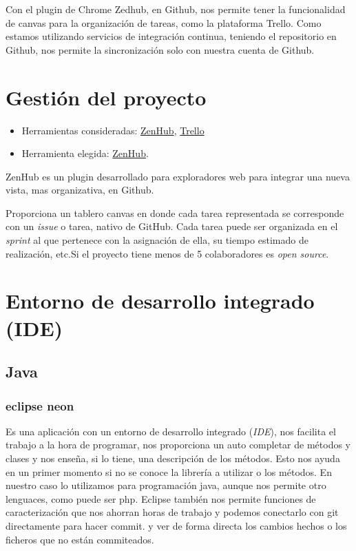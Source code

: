 Con el plugin de Chrome Zedhub, en Github, nos permite tener la funcionalidad de canvas para la organización de tareas, como la plataforma Trello. Como estamos utilizando servicios de integración continua, teniendo el repositorio en Github, nos permite la sincronización solo con nuestra cuenta de Github. \cite{web:github}

\section{Gestión del proyecto}\label{gestion-del-proyecto}

\begin{itemize}
	\tightlist
	\item
	Herramientas consideradas: \href{https://www.zenhub.com/}{ZenHub},
	\href{https://trello.com/}{Trello}
	\item
	Herramienta elegida: \href{https://www.zenhub.com/}{ZenHub}.
\end{itemize}

ZenHub es un plugin desarrollado para exploradores web para integrar una nueva vista, mas organizativa, en Github. 

Proporciona un tablero canvas en donde cada tarea representada se corresponde con un \emph{issue} o tarea, nativo de GitHub. Cada tarea puede ser organizada en el \emph{sprint} al que pertenece con la asignación de ella, su tiempo estimado de realización, etc.Si el proyecto tiene menos de 5 colaboradores es \emph{open source}. \cite{web:zenhub}


\section{Entorno de desarrollo integrado
	(IDE)}\label{entorno-de-desarrollo-integrado-ide}

\subsection{Java}\label{java}

\subsubsection{eclipse neon}\label{eclipse}
Es una aplicación con un entorno de desarrollo integrado (\emph{IDE}), nos facilita el trabajo a la hora de programar, nos proporciona un auto completar de métodos y clases y nos enseña, si lo tiene, una descripción de los métodos. Esto nos ayuda en un primer momento si no se conoce la librería a utilizar o los métodos. En nuestro caso lo utilizamos para programación java, aunque nos permite otro lenguaces, como puede ser php.
Eclipse también nos permite funciones de caracterización que nos ahorran horas de trabajo y podemos conectarlo con git directamente para hacer commit. y ver de forma directa los cambios hechos o los ficheros que no están commiteados.\cite{web:eclipse}

